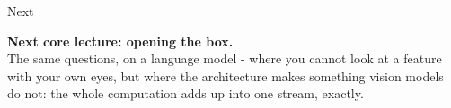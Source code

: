 \documentclass[aspectratio=169]{beamer}
\newcommand{\takebox}[1]{%
  \begin{tcolorbox}[colback=paramgreen!8, colframe=paramgreen, boxrule=0.6pt, arc=2pt]
  #1
  \end{tcolorbox}}
\begin{document}
\begin{frame}{Next}
  \vspace{1.2em}
  \takebox{\textbf{Next core lecture: opening the box.}\\[0.6em]
  The same questions, on a language model - where you cannot look at a feature with your own eyes,
  but where the architecture makes something vision models do not: the whole computation adds up
  into one stream, exactly.}
\end{frame}
\end{document}
